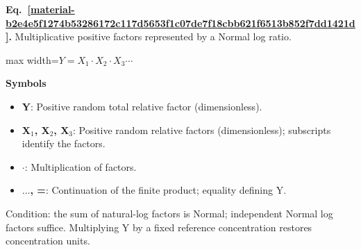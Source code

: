 \documentclass[11pt,a4paper]{article}
\begin{document}
\par\medskip
\noindent\begin{minipage}{\linewidth}
\label{material-b2e4e5f1274b53286172c117d5653f1c07de7f18cbb621f6513b852f7dd1421d}
\noindent\textbf{Eq.~\ref*{material-b2e4e5f1274b53286172c117d5653f1c07de7f18cbb621f6513b852f7dd1421d}.} Multiplicative positive factors represented by a Normal log ratio.\par\nopagebreak
\begin{center}\begin{adjustbox}{max width=\linewidth}$\displaystyle Y=X_1\cdot X_2\cdot X_3\cdots$\end{adjustbox}\end{center}

\par\noindent\textbf{Symbols}

\begin{itemize}\setlength{\itemsep}{1pt}\setlength{\parsep}{0pt}
\item \textbf{Y}: Positive random total relative factor (dimensionless).
\item \textbf{X\ensuremath{{}_1}, X\ensuremath{{}_2}, X\ensuremath{{}_3}}: Positive random relative factors (dimensionless); subscripts identify the factors.
\item \textbf{\ensuremath{\cdot}}: Multiplication of factors.
\item \textbf{\ensuremath{\ldots}, =}: Continuation of the finite product; equality defining Y.
\end{itemize}

Condition: the sum of natural-log factors is Normal; independent Normal log factors suffice. Multiplying Y by a fixed reference concentration restores concentration units.

\end{minipage}\par
\medskip
\end{document}
